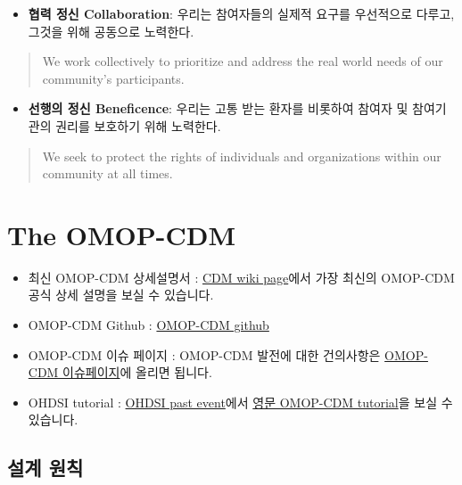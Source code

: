 \documentclass[]{book}
\providecommand{\tightlist}{%
  \setlength{\itemsep}{0pt}\setlength{\parskip}{0pt}}
\begin{document}
\begin{itemize}
\tightlist
\item
  \textbf{협력 정신 Collaboration}: 우리는 참여자들의 실제적 요구를 우선적으로 다루고, 그것을 위해 공동으로 노력한다.
\end{itemize}

\begin{quote}
We work collectively to prioritize and address the real world needs of our community's participants.
\end{quote}

\begin{itemize}
\tightlist
\item
  \textbf{선행의 정신 Beneficence}: 우리는 고통 받는 환자를 비롯하여 참여자 및 참여기관의 권리를 보호하기 위해 노력한다.
\end{itemize}

\begin{quote}
We seek to protect the rights of individuals and organizations within our community at all times.
\end{quote}

\hypertarget{omopCdm}{%
\chapter{The OMOP-CDM}\label{omopCdm}}

\begin{itemize}
\tightlist
\item
  최신 OMOP-CDM 상세설명서 : \href{https://github.com/ohdsi/commondatamodel/wiki}{CDM wiki page}에서 가장 최신의 OMOP-CDM 공식 상세 설명을 보실 수 있습니다.
\item
  OMOP-CDM Github : \href{https://github.com/ohdsi/commondatamodel}{OMOP-CDM github}
\item
  OMOP-CDM 이슈 페이지 : OMOP-CDM 발전에 대한 건의사항은 \href{https://github.com/ohdsi/commondatamodel/issues}{OMOP-CDM 이슈페이지}에 올리면 됩니다.
\item
  OHDSI tutorial : \href{https://www.ohdsi.org/past-events/}{OHDSI past event}에서 \href{https://www.ohdsi.org/past-events/2018-tutorials-omop-common-data-model-and-standardized-vocabularies/}{영문 OMOP-CDM tutorial}을 보실 수 있습니다.
\end{itemize}

\hypertarget{section-2}{%
\section{설계 원칙}\label{section-2}}
\end{document}
